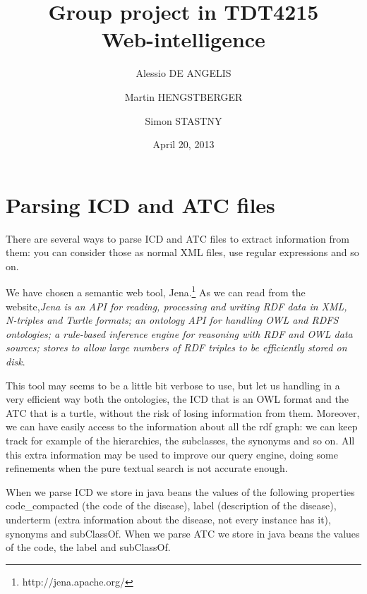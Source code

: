 \documentclass{article}
\begin{document}
\title{Group project in TDT4215\\
Web-intelligence}

\date{April 20, 2013}

\author{
  Alessio DE ANGELIS\and 
  Martin HENGSTBERGER\and
  Simon STASTNY}

\maketitle
\newpage
\tableofcontents

\section{Parsing ICD and ATC files}

There are several ways to parse ICD and ATC files to extract information from them: you can consider those as normal XML files, use regular expressions and so on.

We have chosen a semantic web tool, Jena.\footnote{http://jena.apache.org/} As we can read from the website,\emph{Jena is an API for reading, processing and writing RDF data in XML, N-triples and Turtle formats; an ontology API for handling OWL and RDFS ontologies; a rule-based inference engine for reasoning with RDF and OWL data sources; stores to allow large numbers of RDF triples to be efficiently stored on disk}. 

This tool may seems to be a little bit verbose to use, but let us handling in a very efficient way both the ontologies, the ICD that is an OWL format and the ATC that is a turtle, without the risk of losing information from them. Moreover, we can have easily access to the information about all the rdf graph: we can keep track for example of the hierarchies, the subclasses, the synonyms and so on. All this extra information may be used to improve our query engine, doing some refinements when the pure textual search is not accurate enough.

When we parse ICD we store in java beans the values of the following properties code\_compacted (the code of the disease), label (description of the disease), underterm (extra information about the disease, not every instance has it), synonyms and subClassOf.
When we parse ATC we store in java beans the values of the code, the label and subClassOf.
\end{document}
